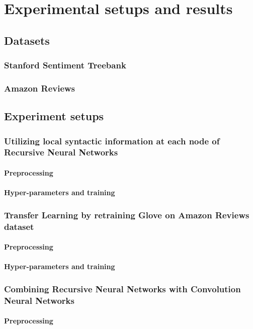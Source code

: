 \hypertarget{chap:result}{\chapter{Experimental setups and results}}\label{result-discuss}
\section{Datasets}
\subsection{Stanford Sentiment Treebank}
\subsection{Amazon Reviews}
\section{Experiment setups}
\subsection{Utilizing local syntactic information at each node of Recursive Neural Networks}
\subsubsection{Preprocessing}
\subsubsection{Hyper-parameters and training}
\subsection{Transfer Learning by retraining Glove on Amazon Reviews dataset}
\subsubsection{Preprocessing}
\subsubsection{Hyper-parameters and training}
\subsection{Combining Recursive Neural Networks with Convolution Neural Networks}
\subsubsection{Preprocessing}
